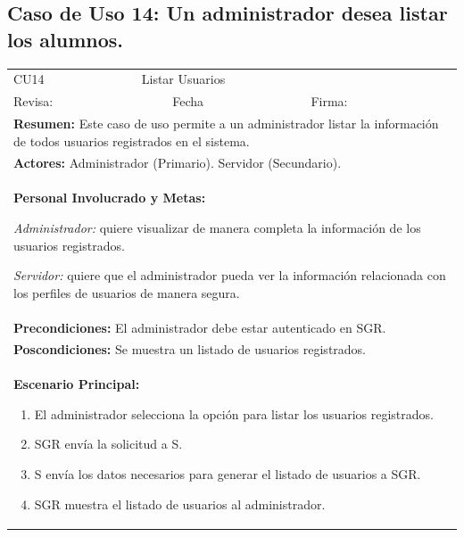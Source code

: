 		\subsection{Caso de Uso 14: Un administrador desea listar los alumnos.}
			\begin{longtable}{|l|p{5.5cm}|l|p{2cm}|l|p{1.9cm}|} \hline
					\cellcolor{grisOscuro} CU14 & \multicolumn{4}{|l|}{  \cellcolor{grisOscuro} Listar Usuarios} &  \cellcolor{grisClaro}\multirow{2}{1cm}{} \\ \cline{1-5}
					\cellcolor{grisOscuro} Revisa: &  \cellcolor{grisClaro} &  \cellcolor{grisOscuro} Fecha &  \cellcolor{grisClaro} &  \cellcolor{grisOscuro} Firma: & \cellcolor{grisClaro} \\ \hline
					\multicolumn{6}{|p{15cm}|}{ \textbf{Resumen: } Este caso de uso permite a un administrador listar la información de todos usuarios registrados en el sistema.

					} \\ \hline

					\multicolumn{6}{|p{15cm}|}{ \textbf{Actores: } Administrador (Primario). Servidor (Secundario).

					} \\ \hline

					\multicolumn{6}{|p{15cm}|}{ \textbf{Personal Involucrado y Metas: }

					\emph{Administrador:} quiere visualizar de manera completa la información de los usuarios registrados.

					\emph{Servidor:} quiere que el administrador pueda ver la información relacionada con los perfiles de usuarios de manera segura.

					} \\ \hline

					\multicolumn{6}{|p{15cm}|}{ \textbf{Precondiciones: } El administrador debe estar autenticado en SGR.

					} \\ \hline

					\multicolumn{6}{|p{15cm}|}{ \textbf{Poscondiciones: } Se muestra un listado de usuarios registrados.

					} \\ \hline

					\multicolumn{6}{|p{15cm}|}{ \textbf{Escenario Principal: }

					\begin{enumerate}
							\item El administrador selecciona la opción para listar los usuarios registrados.
							\item SGR envía la solicitud a S.
							\item S envía los datos necesarios para generar el listado de usuarios a SGR.
							\item SGR muestra el listado de usuarios al administrador.
					\end{enumerate}

}
\end{longtable}
